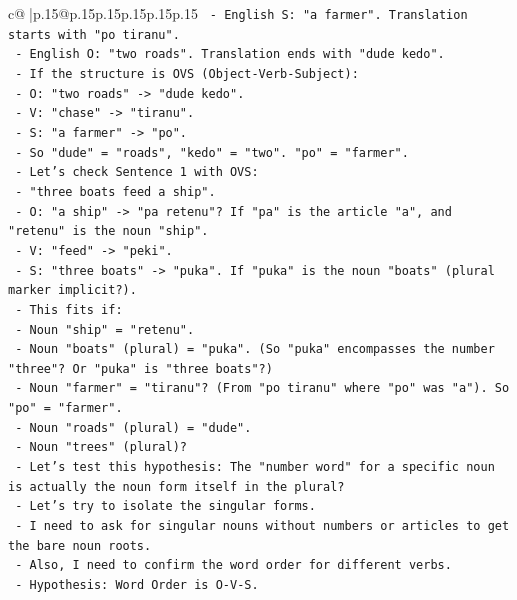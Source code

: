 \documentclass{article}
\begin{document}
{\begin{supertabular}{c@{$\;$}|p{.15\linewidth}@{}p{.15\linewidth}p{.15\linewidth}p{.15\linewidth}p{.15\linewidth}p{.15\linewidth}}
{{{\texttt{       {-} English S: "a farmer". Translation starts with "po tiranu".} \\
\texttt{       {-} English O: "two roads". Translation ends with "dude kedo".} \\
\texttt{       {-} If the structure is OVS (Object{-}Verb{-}Subject):} \\
\texttt{         {-} O: "two roads" {-}> "dude kedo".} \\
\texttt{         {-} V: "chase" {-}> "tiranu".} \\
\texttt{         {-} S: "a farmer" {-}> "po".} \\
\texttt{       {-} So "dude" = "roads", "kedo" = "two". "po" = "farmer".} \\
\texttt{     {-} Let's check Sentence 1 with OVS:} \\
\texttt{       {-} "three boats feed a ship".} \\
\texttt{       {-} O: "a ship" {-}> "pa retenu"? If "pa" is the article "a", and "retenu" is the noun "ship".} \\
\texttt{       {-} V: "feed" {-}> "peki".} \\
\texttt{       {-} S: "three boats" {-}> "puka". If "puka" is the noun "boats" (plural marker implicit?).} \\
\texttt{       {-} This fits if:} \\
\texttt{         {-} Noun "ship" = "retenu".} \\
\texttt{         {-} Noun "boats" (plural) = "puka". (So "puka" encompasses the number "three"? Or "puka" is "three boats"?)} \\
\texttt{         {-} Noun "farmer" = "tiranu"? (From "po tiranu" where "po" was "a"). So "po" = "farmer".} \\
\texttt{         {-} Noun "roads" (plural) = "dude".} \\
\texttt{         {-} Noun "trees" (plural)?} \\
\texttt{     {-} Let's test this hypothesis: The "number word" for a specific noun is actually the noun form itself in the plural?} \\
\texttt{     {-} Let's try to isolate the singular forms.} \\
\texttt{     {-} I need to ask for singular nouns without numbers or articles to get the bare noun roots.} \\
\texttt{     {-} Also, I need to confirm the word order for different verbs.} \\
\texttt{     {-} Hypothesis: Word Order is O{-}V{-}S.} \\
}}}
\end{supertabular}}
\end{document}
